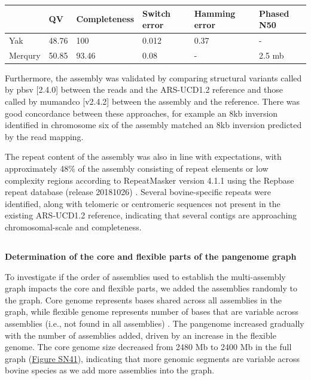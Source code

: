 \documentclass[../main.tex]{subfiles}
\begin{document}
\begin{flushleft}
\begin{center}
    \centering
    \begin{tabular}{|l|l|l|l|l|l|}
    \hline
    ~       & QV    & Completeness & Switch error & Hamming error & Phased N50  \\
    \hline
    Yak     & 48.76 & 100          & 0.012        & 0.37          & -           \\
    \hline
    Merqury & 50.85 & 93.46        & 0.08         & -             & 2.5 mb      \\
    \hline
    \end{tabular}
\end{center}

\normalsize
\bigskip

Furthermore, the assembly was validated by comparing structural variants called by pbsv [2.4.0] between the reads and the ARS-UCD1.2 reference and those called by mumandco [v2.4.2] \citep{o2020mum} between the assembly and the reference. There was good concordance between these approaches, for example an 8kb inversion identified in chromosome six of the assembly matched an 8kb inversion predicted by the read mapping.

\bigskip

The repeat content of the assembly was also in line with expectations, with approximately 48\% of the assembly consisting of repeat elements or low complexity regions according to RepeatMasker version 4.1.1 \citep{Smit2015} using the Repbase repeat database (release 20181026) \citep{bao2015repbase}. Several bovine-specific repeats were identified, along with telomeric or centromeric sequences not present in the existing ARS-UCD1.2 reference, indicating that several contigs are approaching chromosomal-scale and completeness.

\newpage

\subsection{}
\label{sup_not:s42}
\textbf{Determination of the core and flexible parts of the pangenome graph}
\bigskip

To investigate if the order of assemblies used to establish the multi-assembly graph impacts the core and flexible parts, we added the assemblies randomly to the graph. Core genome represents bases shared across all assemblies in the graph, while flexible genome represents number of bases that are variable across assemblies (i.e., not found in all assemblies) \citep{golicz2020pangenomics}. The pangenome increased gradually with the number of assemblies added, driven by an increase in the flexible genome. The core genome size decreased from 2480 Mb to 2400 Mb in the full graph (\hyperlink{Figure SN41}{Figure SN41}), indicating that more genomic segments are variable across bovine species as we add more assemblies into the graph.
\bigskip


\end{flushleft}
\end{document}
